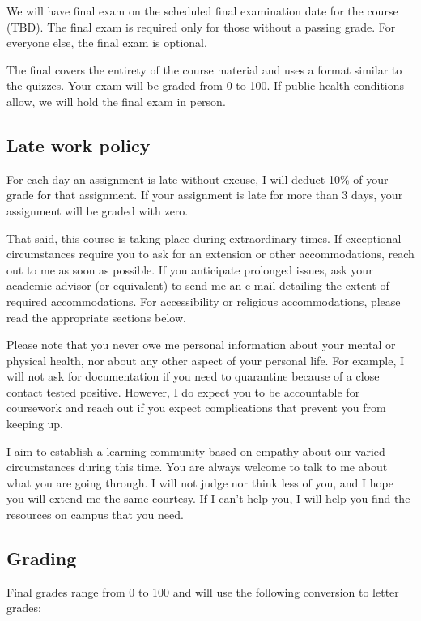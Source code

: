 \documentclass[
  11pt,
]{article}
\begin{document}
We will have final exam on the scheduled final examination date for the
course (TBD). The final exam is required only for those without a
passing grade. For everyone else, the final exam is optional.

The final covers the entirety of the course material and uses a format
similar to the quizzes. Your exam will be graded from 0 to 100. If
public health conditions allow, we will hold the final exam in person.

\hypertarget{late-work-policy}{%
\subsection{Late work policy}\label{late-work-policy}}

For each day an assignment is late without excuse, I will deduct 10\% of
your grade for that assignment. If your assignment is late for more than
3 days, your assignment will be graded with zero.

That said, this course is taking place during extraordinary times. If
exceptional circumstances require you to ask for an extension or other
accommodations, reach out to me as soon as possible. If you anticipate
prolonged issues, ask your academic advisor (or equivalent) to send me
an e-mail detailing the extent of required accommodations. For
accessibility or religious accommodations, please read the appropriate
sections below.

Please note that you never owe me personal information about your mental
or physical health, nor about any other aspect of your personal life.
For example, I will not ask for documentation if you need to quarantine
because of a close contact tested positive. However, I do expect you to
be accountable for coursework and reach out if you expect complications
that prevent you from keeping up.

I aim to establish a learning community based on empathy about our
varied circumstances during this time. You are always welcome to talk to
me about what you are going through. I will not judge nor think less of
you, and I hope you will extend me the same courtesy. If I can't help
you, I will help you find the resources on campus that you need.

\hypertarget{grading}{%
\subsection{Grading}\label{grading}}

Final grades range from 0 to 100 and will use the following conversion
to letter grades:
\end{document}
